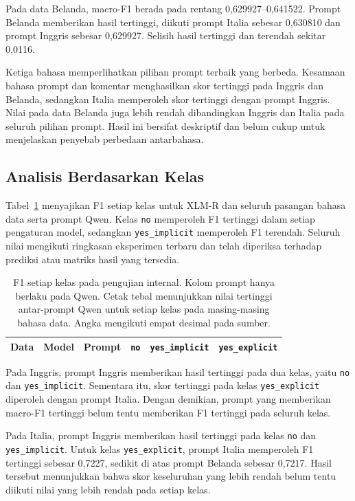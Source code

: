 \documentclass[11pt]{article}
\begin{document}
Pada data Belanda, macro-F1 berada pada rentang 0,629927--0,641522. Prompt Belanda memberikan hasil tertinggi, diikuti prompt Italia sebesar 0,630810 dan prompt Inggris sebesar 0,629927. Selisih hasil tertinggi dan terendah sekitar 0,0116.

Ketiga bahasa memperlihatkan pilihan prompt terbaik yang berbeda. Kesamaan bahasa prompt dan komentar menghasilkan skor tertinggi pada Inggris dan Belanda, sedangkan Italia memperoleh skor tertinggi dengan prompt Inggris. Nilai pada data Belanda juga lebih rendah dibandingkan Inggris dan Italia pada seluruh pilihan prompt. Hasil ini bersifat deskriptif dan belum cukup untuk menjelaskan penyebab perbedaan antarbahasa.

\subsection{Analisis Berdasarkan Kelas}
Tabel~\ref{tab:classes} menyajikan F1 setiap kelas untuk XLM-R dan seluruh pasangan bahasa data serta prompt Qwen. Kelas \texttt{no} memperoleh F1 tertinggi dalam setiap pengaturan model, sedangkan \texttt{yes\_implicit} memperoleh F1 terendah. Seluruh nilai mengikuti ringkasan eksperimen terbaru dan telah diperiksa terhadap prediksi atau matriks hasil yang tersedia.

\begin{table}[t]
\centering
\begin{tabular}{lllrrr}
\toprule
Data & Model & Prompt & \texttt{no} & \texttt{yes\_implicit} & \texttt{yes\_explicit} \\
\midrule

\end{tabular}
\caption{F1 setiap kelas pada pengujian internal. Kolom prompt hanya berlaku pada Qwen. Cetak tebal menunjukkan nilai tertinggi antar-prompt Qwen untuk setiap kelas pada masing-masing bahasa data. Angka mengikuti empat desimal pada sumber.}
\label{tab:classes}
\end{table}

Pada Inggris, prompt Inggris memberikan hasil tertinggi pada dua kelas, yaitu \texttt{no} dan \nolinkurl{yes_implicit}. Sementara itu, skor tertinggi pada kelas \nolinkurl{yes_explicit} diperoleh dengan prompt Italia. Dengan demikian, prompt yang memberikan macro-F1 tertinggi belum tentu memberikan F1 tertinggi pada seluruh kelas.

Pada Italia, prompt Inggris memberikan hasil tertinggi pada kelas \texttt{no} dan \nolinkurl{yes_implicit}. Untuk kelas \nolinkurl{yes_explicit}, prompt Italia memperoleh F1 tertinggi sebesar 0,7227, sedikit di atas prompt Belanda sebesar 0,7217. Hasil tersebut menunjukkan bahwa skor keseluruhan yang lebih rendah belum tentu diikuti nilai yang lebih rendah pada setiap kelas.
\end{document}
